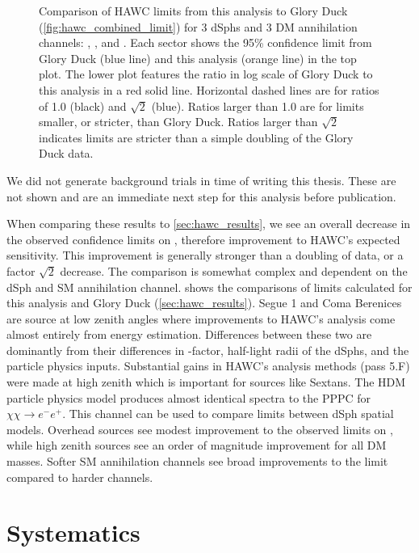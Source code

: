 \begin{figure}[h]
{\begin{tabular}{cccc}
    \end{tabular}
    }
    \caption{Comparison of HAWC limits from this analysis to Glory Duck (\cref{fig:hawc_combined_limit}) for 3 dSphs and 3 DM annihilation channels: , \parpar{\tau}, and . Each sector shows the 95\% confidence limit from Glory Duck (blue line) and this analysis (orange line) in the top plot. The lower plot features the ratio in log scale of Glory Duck to this analysis in a red solid line. Horizontal dashed lines are for ratios of 1.0 (black) and $\sqrt{2}$ (blue). Ratios larger than 1.0 are for limits smaller, or stricter, than Glory Duck. Ratios larger than $\sqrt{2}$ indicates limits are stricter than a simple doubling of the Glory Duck data.}
\label{fig:mtd_compare2gd}
\end{figure}

We did not generate background trials in time of writing this thesis.
These are not shown and are an immediate next step for this analysis before publication.

When comparing these results to \cref{sec:hawc_results}, we see an overall decrease in the observed confidence limits on \sv, therefore improvement to HAWC's expected sensitivity.
This improvement is generally stronger than a doubling of data, or a factor $\sqrt{2}$ decrease.
The comparison is somewhat complex and dependent on the dSph and SM annihilation channel.
 shows the comparisons of limits calculated for this analysis and Glory Duck (\cref{sec:hawc_results}).
Segue 1 and Coma Berenices are source at low zenith angles where improvements to HAWC's analysis come almost entirely from energy estimation.
Differences between these two are dominantly from their differences in \J-factor, half-light radii of the dSphs, and the particle physics inputs.
Substantial gains in HAWC's analysis methods (pass 5.F) were made at high zenith which is important for sources like Sextans.
The HDM particle physics model produces almost identical spectra to the PPPC for $\chi\chi \rightarrow e^-e^+$.
This channel can be used to compare limits between dSph spatial models.
Overhead sources see modest improvement to the observed limits on \sv, while high zenith sources see an order of magnitude improvement for all DM masses.
Softer SM annihilation channels see broad improvements to the limit compared to harder channels.


\section{Systematics}\label{sec:mtd_systemaics}

